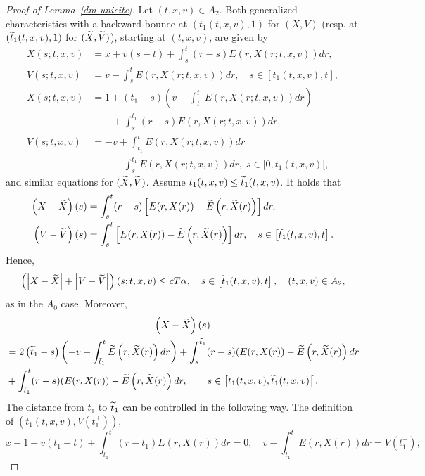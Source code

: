 \documentclass[10pt]{amsart}
\theoremstyle{definition}\newtheorem{defi}[theo]{Definition}\newtheorem{rema}[theo]{Remark}\newtheorem{exam}[theo]{Example}\newtheorem{exem}[theo]{Example}\newtheorem{nota}[theo]{Notation}
\let\oldtilde\tilde
\renewcommand*{\tilde}[1]{\mathchoice{\widetilde{#1}}{\widetilde{#1}}{\oldtilde{#1}}{\oldtilde{#1}}}
\begin{document}
\begin{proof}[{Proof of Lemma~\ref{dm-unicite}}]
Let $(t,x,v)\in A_2$. Both generalized characteristics with a backward bounce at $(t_1(t,x,v),1)$ for $(X,V)$ (resp. at $(\tilde{t}_1(t,x,v),1)$ for $(\tilde{X},\tilde{V})$), starting at $(t,x,v)$, are given by
\begin{align*}
X(s;t,x,v)&= x+v(s-t)+\int_s^t (r-s)E\left(r,X(r;t,x,v)\right)dr, \\
V(s;t,x,v)&= v-\int_s^t E(r,X(r;t,x,v))dr, \quad s \in [t_1(t,x,v),t], \\
X(s;t,x,v)&= 1+(t_1-s) \left (v-\int_{t_1}^t E(r,X(r;t,x,v))dr \right) \\
&\qquad + \int_s^{t_1} (r-s)E(r,X(r;t,x,v))dr, \\
V(s;t,x,v) &= -v+\int_{t_1}^t E(r,X(r;t,x,v))dr 
\\
&\qquad- \int_s^{t_1} E(r,X(r;t,x,v))dr, \; s \in [0,t_1(t,x,v)[,
\end{align*}
and similar equations for $(\tilde{X},\tilde{V})$. Assume $t_1(t,x,v)\leq
\tilde{t}_1(t,x,v)$. It holds that
\begin{align*}
\left(X-\tilde{X}\right)(s) &= \int_s^t (r-s) \left [E(r,X(r))-\tilde{E}\left(r,\tilde{X}(r)\right) \right] dr, \\
\left(V-\tilde{V}\right)(s) &= \int_s^t \left[E(r,X(r))-\tilde{E}\left(r,\tilde{X}(r)\right) \right] dr, \quad s \in \left[\tilde{t}_1(t,x,v),t\right].
\end{align*}
Hence,
\begin{equation}\label{A2-a}
\left (\left|X-\tilde{X}\right|+\left|V-\tilde{V}\right| \right) (s;t,x,v) \leq cT\alpha, \quad s \in \left[\tilde{t}_1(t,x,v),t\right], \quad (t,x,v)\in A_2,
\end{equation}
as in the $A_0$ case. Moreover,
\begin{multline}\label{A2-b}
\left(X-\tilde{X}\right)(s)\\
\begin{aligned}
&= 2\left(\tilde{t}_1-s\right) \left(-v + \int _{\tilde{t}_1}^t \tilde{E}\left(r,\tilde{X}(r)\right)dr \right) + \int_s^{\tilde{t}_1} (r-s) (E(r,X(r))-\tilde{E}\left(r,\tilde{X}(r)\right) dr \\
&+ \int_{\tilde{t}_1}^t (r-s) (E(r,X(r))-\tilde{E}\left(r,\tilde{X}(r)\right)dr, \qquad s \in \left[t_1(t,x,v), \tilde{t}_1(t,x,v)\right[.
\end{aligned}
\end{multline}
The distance from $t_1$ to $\tilde{t}_1$ can be controlled in the following way. The definition of $(t_1(t,x,v), V(t_1^+))$,
\[
x-1+v(t_1-t)+\int_{t_1}^t (r-t_1)E(r,X(r))dr = 0, \quad v-\int_{t_1}^t E(r,X(r))dr = V(t_1^+),
\]
\end{proof}
\end{document}
